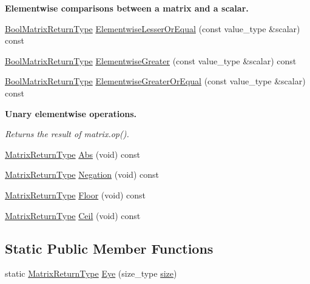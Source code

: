 \begin{Indent}{\bf Elementwise comparisons between a matrix and a scalar.}
\begin{DoxyCompactItemize}
\item 
\hyperlink{classvct_dynamic_const_matrix_base_ac71d88dda7abaaeb2276b83f2e49def7}{Bool\-Matrix\-Return\-Type} \hyperlink{classvct_dynamic_const_matrix_base_a3e89273de0ea20701bc0472b821c54e1}{Elementwise\-Lesser\-Or\-Equal} (const value\-\_\-type \&scalar) const 
\item 
\hyperlink{classvct_dynamic_const_matrix_base_ac71d88dda7abaaeb2276b83f2e49def7}{Bool\-Matrix\-Return\-Type} \hyperlink{classvct_dynamic_const_matrix_base_a6ba365be3edae6dd627eb2461dcad872}{Elementwise\-Greater} (const value\-\_\-type \&scalar) const 
\item 
\hyperlink{classvct_dynamic_const_matrix_base_ac71d88dda7abaaeb2276b83f2e49def7}{Bool\-Matrix\-Return\-Type} \hyperlink{classvct_dynamic_const_matrix_base_af0b14476cc5189fee783355d05ccd004}{Elementwise\-Greater\-Or\-Equal} (const value\-\_\-type \&scalar) const 
\end{DoxyCompactItemize}
\end{Indent}
\begin{Indent}{\bf Unary elementwise operations.}\par
{\em Returns the result of matrix.\-op(). }\begin{DoxyCompactItemize}
\item 
\hyperlink{classvct_dynamic_const_matrix_base_aed2ac5b2cf673fab97a67418f8e69646}{Matrix\-Return\-Type} \hyperlink{classvct_dynamic_const_matrix_base_a6112557b7fa9c8fc5360286334ae7898}{Abs} (void) const 
\item 
\hyperlink{classvct_dynamic_const_matrix_base_aed2ac5b2cf673fab97a67418f8e69646}{Matrix\-Return\-Type} \hyperlink{classvct_dynamic_const_matrix_base_a4d83f37fd5342669a5d3fd17271e68a9}{Negation} (void) const 
\item 
\hyperlink{classvct_dynamic_const_matrix_base_aed2ac5b2cf673fab97a67418f8e69646}{Matrix\-Return\-Type} \hyperlink{classvct_dynamic_const_matrix_base_aeadf36f7a94a997998918671bad8dff9}{Floor} (void) const 
\item 
\hyperlink{classvct_dynamic_const_matrix_base_aed2ac5b2cf673fab97a67418f8e69646}{Matrix\-Return\-Type} \hyperlink{classvct_dynamic_const_matrix_base_ad026f25a7db75e0a6a37f5faaa3a7190}{Ceil} (void) const 
\end{DoxyCompactItemize}
\end{Indent}
\subsection*{Static Public Member Functions}
\begin{DoxyCompactItemize}
\item 
static \hyperlink{classvct_dynamic_const_matrix_base_aed2ac5b2cf673fab97a67418f8e69646}{Matrix\-Return\-Type} \hyperlink{classvct_dynamic_const_matrix_base_a86f83e5cc8cc5c30cb14fc6be7d5bedf}{Eye} (size\-\_\-type \hyperlink{classvct_dynamic_const_matrix_base_ab9d484f83471aee6512ea614aa54bd0b}{size})
\end{DoxyCompactItemize}
